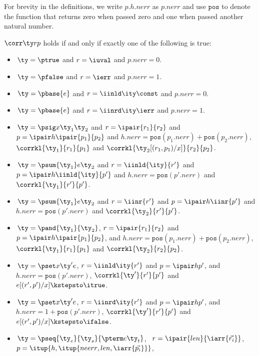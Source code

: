For brevity in the definitions, we write $p.h.{nerr}$ as $p.{nerr}$ and use $\mathtt{pos}$ to
denote the function that returns zero when passed zero and one when
passed another natural number.

\begin{definition}
$\corr \ty r p$ holds if and only if exactly one of the following is true:
  \begin{itemize}
  \item $\,\ty = \ptrue$ and $r = \iuval$ and $p.{nerr} = 0$.
  \item $\,\ty = \pfalse$ and $r = \ierr$ and $p.{nerr} = 1$.
  \item $\,\ty = \pbase{e}$ and $r = \iinld \ity \const$ and $p.{nerr} = 0$.
  \item $\,\ty = \pbase{e}$ and $r = \iinrd \ity \ierr$ and $p.{nerr} = 1$.
  \item $\,\ty = \psig x {\ty_1} {\ty_2}$ and $r =\ipair {r_1} {r_2}$ and $p =
    \ipair h {\ipair {p_1} {p_2}}$ 
    and $h.{nerr} = \mathtt{pos}(p_1.{nerr}) + \mathtt{pos}(p_2.{nerr})$, $\corrkl
    {\ty_1} {r_1} {p_1}$ and $\corrkl {\ty_2[(r_1,p_1)/x]} {r_2} {p_2}$.
  \item $\,\ty = \psum {\ty_1} e {\ty_2}$ and $r =\iinld {\ity}{r'}$
    and $p = \ipair h {\iinld {\ity}{p'}}$
    and $h.{nerr} = \mathtt{pos}(p'.{nerr})$ and $\corrkl
    {\ty_1} {r'} {p'}$.
  \item $\,\ty = \psum {\ty_1} e {\ty_2}$ and $r =\iinr {r'}$
    and $p = \ipair h {\iinr {p'}}$
    and $h.{nerr} = \mathtt{pos}(p'.{nerr})$ and $\corrkl
    {\ty_2} {r'} {p'}$.
  \item $\,\ty = \pand {\ty_1} {\ty_2}$, $r = \ipair {r_1} {r_2}$ and $p =
    \ipair h {\ipair {p_1}{p_2}}$, 
    and $h.{nerr} = \mathtt{pos}(p_1.{nerr}) + \mathtt{pos}(p_2.{nerr})$, 
    $\corrkl {\ty_1} {r_1} {p_1}$ and $\corrkl {\ty_2} {r_2} {p_2}$.
  \item $\,\ty = \pset x {\ty'} e$, $r = \iinld \ity {r'}$ and $p =
    \ipair h {p'}$, 
    and $h.{nerr} = \mathtt{pos}(p'.{nerr})$, $\corrkl {\ty'}{r'}{p'}$
    and $e[(r',p')/x] \kstepsto\itrue$.
  \item $\,\ty = \pset x {\ty'} e$, $r = \iinrd \ity {r'}$
    and $p = \ipair h {p'}$,
    and $h.{nerr} = 1 + \mathtt{pos}(p'.{nerr})$,
    $\corrkl {\ty'}{r'}{p'}$ and $e[(r',p')/x] \kstepsto \ifalse$.
  \item $\,\ty = \pseq {\ty_e}{\ty_s}{\pterm e {\ty_t}}$, \
    $r = \ipair {len} {\iarr{\vec {r_i}}}$, \
    $p = \itup{h,\itup{{neerr},{len},\iarr {\vec {p_i}}}}$,\\

\end{itemize}
\end{definition}
